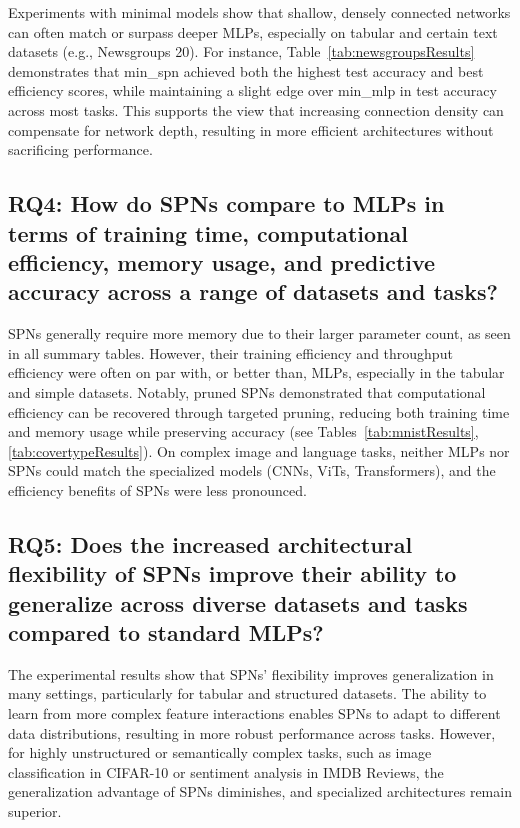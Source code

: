 Experiments with minimal models show that shallow, densely connected networks can often match or surpass deeper MLPs, especially on tabular and certain text datasets (e.g., Newsgroups 20). For instance, Table~\ref{tab:newsgroupsResults} demonstrates that min\_spn achieved both the highest test accuracy and best efficiency scores, while maintaining a slight edge over min\_mlp in test accuracy across most tasks. This supports the view that increasing connection density can compensate for network depth, resulting in more efficient architectures without sacrificing performance.

\subsection*{RQ4: How do SPNs compare to MLPs in terms of training time, computational efficiency, memory usage, and predictive accuracy across a range of datasets and tasks?}

SPNs generally require more memory due to their larger parameter count, as seen in all summary tables. However, their training efficiency and throughput efficiency were often on par with, or better than, MLPs, especially in the tabular and simple datasets. Notably, pruned SPNs demonstrated that computational efficiency can be recovered through targeted pruning, reducing both training time and memory usage while preserving accuracy (see Tables~\ref{tab:mnistResults}, \ref{tab:covertypeResults}). On complex image and language tasks, neither MLPs nor SPNs could match the specialized models (CNNs, ViTs, Transformers), and the efficiency benefits of SPNs were less pronounced.

\subsection*{RQ5: Does the increased architectural flexibility of SPNs improve their ability to generalize across diverse datasets and tasks compared to standard MLPs?}

The experimental results show that SPNs' flexibility improves generalization in many settings, particularly for tabular and structured datasets. The ability to learn from more complex feature interactions enables SPNs to adapt to different data distributions, resulting in more robust performance across tasks. However, for highly unstructured or semantically complex tasks, such as image classification in CIFAR-10 or sentiment analysis in IMDB Reviews, the generalization advantage of SPNs diminishes, and specialized architectures remain superior.


